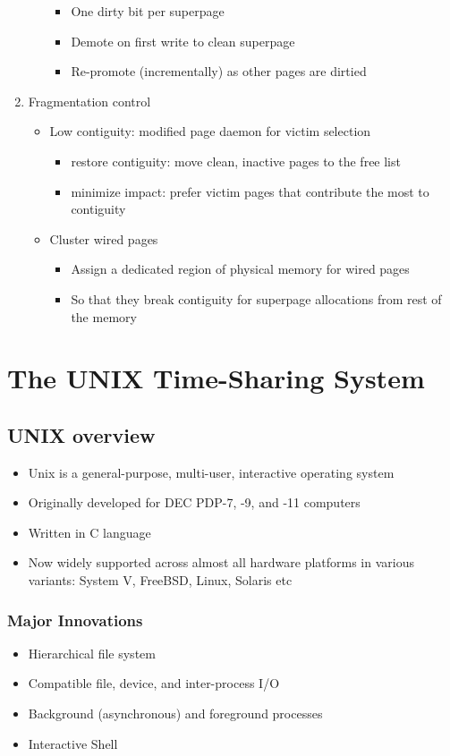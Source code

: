 \documentclass[12pt]{article}
\begin{document}
\begin{enumerate}
\begin{itemize}
\begin{itemize}
            \item One dirty bit per superpage
            \item Demote on first write to clean superpage
            \item Re-promote (incrementally) as other pages are dirtied
        \end{itemize}
    \end{itemize}
    \item Fragmentation control \begin{itemize}
        \item Low contiguity: modified page daemon for victim selection \begin{itemize}
            \item restore contiguity: move clean, inactive pages to the free list
            \item minimize impact: prefer victim pages that contribute the most to contiguity
        \end{itemize}
        \item Cluster wired pages \begin{itemize}
            \item Assign a dedicated region of physical memory for wired pages
            \item So that they break contiguity for superpage allocations from rest of the memory
        \end{itemize}
    \end{itemize}
\end{enumerate}

\section{The UNIX Time-Sharing System}
\subsection{UNIX overview}
\begin{itemize}
    \item Unix is a general-purpose, multi-user, interactive operating system
    \item Originally developed for DEC PDP-7, -9, and -11 computers
    \item Written in C language
    \item Now widely supported across almost all hardware platforms in various variants: System V, FreeBSD, Linux, Solaris etc
\end{itemize}
\subsubsection{Major Innovations}
\begin{itemize}
    \item Hierarchical file system 
    \item Compatible file, device, and inter-process I/O 
    \item Background (asynchronous) and foreground processes 
    \item Interactive Shell
\end{itemize}
\end{document}
